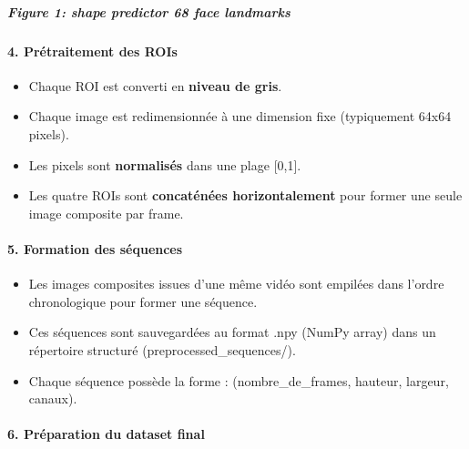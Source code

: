 \documentclass[
]{article}
\begin{document}
\hypertarget{figure-1-shape-predictor-68-face-landmarks}{%
\subparagraph{Figure 1: shape predictor 68 face landmarks}\label{figure-1-shape-predictor-68-face-landmarks}}

\hypertarget{pruxe9traitement-des-rois}{%
\paragraph{\texorpdfstring{\textbf{4. Prétraitement des ROIs}}{4. Prétraitement des ROIs}}\label{pruxe9traitement-des-rois}}

\begin{itemize}
\item
  Chaque ROI est converti en \textbf{niveau de gris}.
\item
  Chaque image est redimensionnée à une dimension fixe (typiquement 64x64 pixels).
\item
  Les pixels sont \textbf{normalisés} dans une plage {[}0,1{]}.
\item
  Les quatre ROIs sont \textbf{concaténées horizontalement} pour former une seule image composite par frame.
\end{itemize}

\hypertarget{formation-des-suxe9quences}{%
\paragraph{\texorpdfstring{\textbf{5. Formation des séquences}}{5. Formation des séquences}}\label{formation-des-suxe9quences}}

\begin{itemize}
\item
  Les images composites issues d'une même vidéo sont empilées dans l'ordre chronologique pour former une séquence.
\item
  Ces séquences sont sauvegardées au format .npy (NumPy array) dans un répertoire structuré (preprocessed\_sequences/).
\item
  Chaque séquence possède la forme : (nombre\_de\_frames, hauteur, largeur, canaux).
\end{itemize}

\hypertarget{pruxe9paration-du-dataset-final}{%
\paragraph{\texorpdfstring{\textbf{6. Préparation du dataset final}}{6. Préparation du dataset final}}\label{pruxe9paration-du-dataset-final}}
\end{document}
